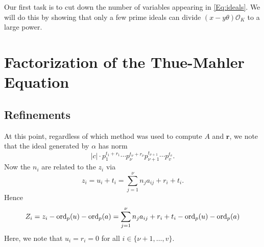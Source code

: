 Our first task is to cut down the number of variables appearing in \eqref{Eq:ideals}. We will do this by showing that only a few prime ideals can divide $(x-y\theta)\mathcal{O}_K$ to a large power. 

\section{Factorization of the Thue-Mahler Equation}

\subsection{Refinements}



At this point, regardless of which method was used to compute $A$ and $\mathbf{r}$, we note that the ideal generated by $\alpha$ has norm
\[|c|\cdot p_1^{t_1 + r_1} \cdots p_{\nu}^{t_{\nu} + r_{\nu}}p_{\nu +1}^{t_{\nu +1}} \cdots p_v^{t_v}.\]
Now the $n_i$ are related to the $z_i$ via
\[z_i = u_i + t_i = \sum_{j = 1}^{\nu}n_ja_{ij} + r_i + t_i.\]
Hence
\[Z_i = z_i - \operatorname{ord}_p(u) - \operatorname{ord}_p(a) = \sum_{j = 1}^{\nu}n_ja_{ij} + r_i + t_i - \operatorname{ord}_p(u) - \operatorname{ord}_p(a) \]
Here, we note that $u_i = r_i = 0$ for all $i \in \{\nu + 1, \dots, v\}$. 


